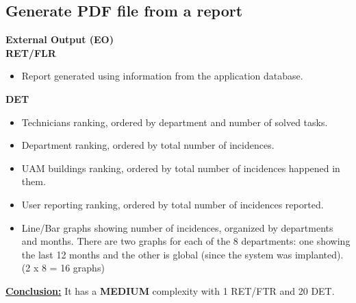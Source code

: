 \subsection{Generate PDF file from a report}
\textbf{External Output (EO)} \\ 
\textbf{RET/FLR}
\begin{itemize}
\item Report generated using information from the application database.
\end{itemize}
\textbf{DET}
\begin{itemize}
\item Technicians ranking, ordered by department and number of solved tasks.
\item Department ranking, ordered by total number of incidences.
\item UAM buildings ranking, ordered by total number of incidences happened in them.
\item User reporting ranking, ordered by total number of incidences reported.
\item Line/Bar graphs showing number of incidences, organized by departments and months. There are two graphs for each of the 8 departments: one showing the last 12 months and the other is global (since the system was implanted). (2 x 8 = 16 graphs)
\end{itemize}
\textbf{\underline{Conclusion:}} It has a \textbf{MEDIUM} complexity with 1 RET/FTR and 20 DET.
